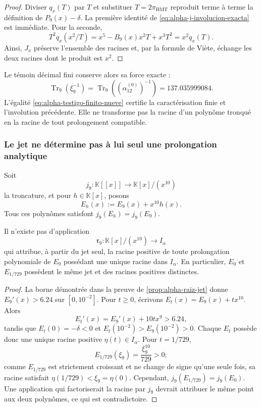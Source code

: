 \begin{proof}
Diviser \(q_x(T)\) par \(T\) et substituer \(T=2\pi_{\mathrm{HMT}}\) reproduit terme à terme la définition de \(P_9(x)-\delta\). La première identité de \eqref{eq:alpha-j-involucion-exacta} est immédiate. Pour la seconde,
\[
 T^2q_x(x^2/T)
 =x^5-B_9(x)x^2T+x^3T^2=x^2q_x(T).
\]
Ainsi, \(J_x\) préserve l'ensemble des racines et, par la formule de Viète,
échange les deux racines dont le produit est \(x^2\).
\end{proof}

Le témoin décimal fini conserve alors sa force exacte :
\begin{equation}
 \operatorname{Tr}_9(\xi_9^{-1})
 =\operatorname{Tr}_9\!\left((\alpha_{12}^{(0)})^{-1}\right)
 =137.035999084.
 \label{eq:alpha-testigo-finito-nueve}
\end{equation}
L'égalité \eqref{eq:alpha-testigo-finito-nueve} certifie la caractérisation finie et l'involution précédente. Elle ne transforme pas la racine d'un polynôme tronqué en la racine de tout prolongement compatible.

\subsubsection{Le jet ne détermine pas à lui seul une prolongation analytique}

Soit
\[
 j_9:\mathbb K[[x]]\longrightarrow \mathbb K[x]/(x^{10})
\]
la troncature, et pour \(h\in\mathbb K[x]\), posons
\begin{equation}
 E_h(x):=E_9(x)+x^{10}h(x).
 \label{eq:alpha-familia-prolongaciones-mismo-jet}
\end{equation}
Tous ces polynômes satisfont \(j_9(E_h)=j_9(E_9)\).

\begin{theorem}
\label{thm:alpha-no-unicidad-prolongacion-jet}
Il n'existe pas d'application
\[
 \mathfrak r_9:\mathbb K[x]/(x^{10})\longrightarrow I_\alpha
\]
qui attribue, à partir du jet seul, la racine positive de toute
prolongation polynomiale de \(E_9\) possédant une unique racine dans
\(I_\alpha\). En particulier, \(E_0\) et \(E_{1/729}\) possèdent le même jet et
des racines positives distinctes.
\end{theorem}

\begin{proof}
La borne démontrée dans la preuve de
\ref{prop:alpha-raiz-jet} donne \(E_9'(x)>6.24\) sur
\([0,10^{-2}]\). Pour \(t\geq0\), écrivons
\(E_t(x)=E_9(x)+tx^{10}\). Alors
\[
 E_t'(x)=E_9'(x)+10tx^9>6.24,
\]
tandis que \(E_t(0)=-\delta<0\) et \(E_t(10^{-2})>E_9(10^{-2})>0\). Chaque \(E_t\) possède donc une unique racine positive \(\eta(t)\in I_\alpha\). Pour \(t=1/729\),
\[
 E_{1/729}(\xi_9)=\frac{\xi_9^{10}}{729}>0;
\]
comme \(E_{1/729}\) est strictement croissant et ne change de signe qu'une seule
fois, sa racine satisfait \(\eta(1/729)<\xi_9=\eta(0)\). Cependant,
\(j_9(E_{1/729})=j_9(E_0)\). Une application qui factoriserait la racine par
\(j_9\) devrait attribuer le même point aux deux polynômes, ce qui est contradictoire.
\end{proof}

